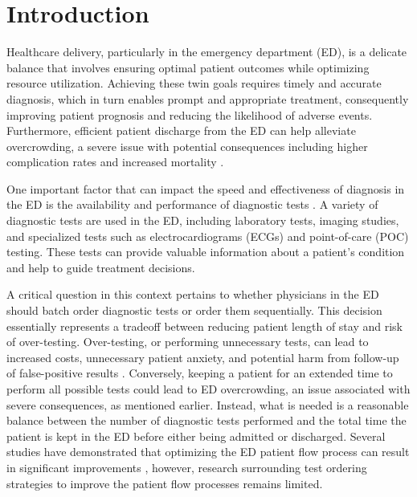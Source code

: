 \documentclass[,,nonblindrev]{informs}
\begin{document}

\maketitle


\hypertarget{sec:I}{%
\section{Introduction}\label{sec:I}}

Healthcare delivery, particularly in the emergency department (ED), is a
delicate balance that involves ensuring optimal patient outcomes while
optimizing resource utilization. Achieving these twin goals requires
timely and accurate diagnosis, which in turn enables prompt and
appropriate treatment, consequently improving patient prognosis and
reducing the likelihood of adverse events. Furthermore, efficient
patient discharge from the ED can help alleviate overcrowding, a severe
issue with potential consequences including higher complication rates
and increased mortality \citet{bernstein2009}.

One important factor that can impact the speed and effectiveness of
diagnosis in the ED is the availability and performance of diagnostic
tests \citet{naseim2015}. A variety of diagnostic tests are used in the
ED, including laboratory tests, imaging studies, and specialized tests
such as electrocardiograms (ECGs) and point-of-care (POC) testing. These
tests can provide valuable information about a patient's condition and
help to guide treatment decisions.

A critical question in this context pertains to whether physicians in
the ED should batch order diagnostic tests or order them sequentially.
This decision essentially represents a tradeoff between reducing patient
length of stay and risk of over-testing. Over-testing, or performing
unnecessary tests, can lead to increased costs, unnecessary patient
anxiety, and potential harm from follow-up of false-positive results
\citet{koch2018}. Conversely, keeping a patient for an extended time to
perform all possible tests could lead to ED overcrowding, an issue
associated with severe consequences, as mentioned earlier. Instead, what
is needed is a reasonable balance between the number of diagnostic tests
performed and the total time the patient is kept in the ED before either
being admitted or discharged. Several studies have demonstrated that
optimizing the ED patient flow process can result in significant
improvements \citet{saghafian2015}, however, research surrounding test
ordering strategies to improve the patient flow processes remains
limited.
\end{document}
